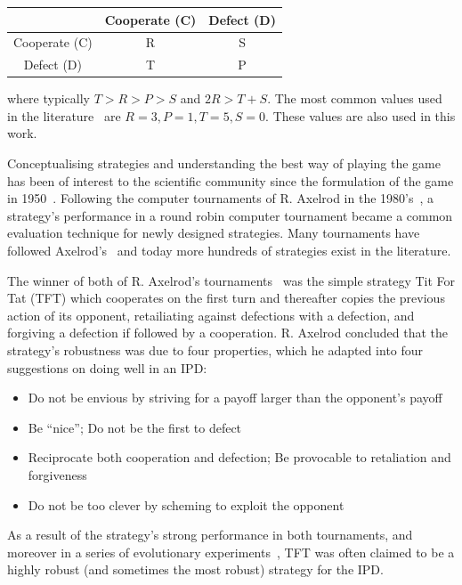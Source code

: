 \documentclass{article}
\begin{document}
\begin{center}
{\renewcommand{\arraystretch}{2}%
\begin{tabular}{c|c|c}
& Cooperate (C) & Defect (D) \\
\hline
Cooperate (C) & R & S \\
\hline
Defect (D) & T & P \\
\end{tabular}}
\end{center}

where typically \(T > R > P > S\) and \(2R > T + S\). The most common values used in
the literature~\cite{Axelrod1981} are $R=3, P=1, T=5, S=0$. These values are also
used in this work.

Conceptualising strategies and understanding the best way of playing the game
has been of interest to the scientific community since the formulation of the
game in 1950~\cite{Flood1958}. Following the computer tournaments of R. Axelrod in the
1980's~\cite{Axelrod1980a, Axelrod1980b}, a strategy's performance in a round
robin computer tournament became a common evaluation technique for newly designed
strategies. Many tournaments have followed Axelrod's~\cite{Beaufils1997, Bendor1991,
Harper2017, Kendall2007, Stephens2002, Stewart2012} and today more hundreds of strategies exist
in the literature.

The winner of both of R. Axelrod's tournaments~\cite{Axelrod1980a, Axelrod1980b}
was the simple strategy Tit For Tat (TFT) which cooperates
on the first turn and thereafter copies the previous action of its opponent,
retailiating against defections with a defection, and forgiving a defection if followed
by a cooperation. R. Axelrod concluded that the strategy's robustness was due to four
properties, which he adapted into four suggestions on doing well in an IPD:

\begin{itemize}
    \item Do not be envious by striving for a payoff larger than the opponent's payoff
    \item Be ``nice''; Do not be the first to defect
    \item Reciprocate both cooperation and defection; Be provocable to retaliation and forgiveness
    \item Do not be too clever by scheming to exploit the opponent
\end{itemize}

As a result of the strategy's strong performance in both tournaments, and moreover in a
series of evolutionary experiments~\cite{Axelrod1981}, TFT was often
claimed to be a highly robust (and sometimes the most robust) strategy for the IPD.
\end{document}
